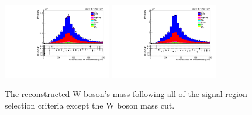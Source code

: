 \begin{figure}[ht]
\centering
\includegraphics[width=0.42\textwidth]{figs/background-estimation/plots/unblinded/prompt_ee_ttbarInc/wPairMass_NPL_ee_bTag_ee.pdf}
\includegraphics[width=0.42\textwidth]{figs/background-estimation/plots/unblinded/prompt_mumu_ttbarInc/wPairMass_NPL_mumu_bTag_mumu.pdf}
\caption{
The reconstructed W boson's mass following all of the signal region selection criteria except the W boson mass cut.
}
\label{fig:App_SR_wMass}
\end{figure}

